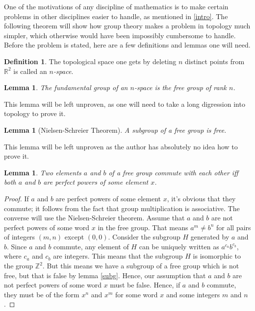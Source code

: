 \documentclass[12pt, titlepage]{article}
\newtheorem{lem}[thm]{Lemma}
\theoremstyle{definition}
\newtheorem{defn}{Definition}[section]
\begin{document}
One of the motivations of any discipline of mathematics is to make certain problems in other disciplines easier to handle, as mentioned in \autoref{intro}. The following theorem will show how group theory makes a problem in topology much simpler, which otherwise would have been impossibly cumbersome to handle. Before the problem is stated, here are a few definitions and lemmas one will need.

\begin{defn}
The topological space one gets by deleting $n$ distinct points from $\mathbb{R}^2$ is called an \emph{$n$-space}.
\end{defn}

\begin{lem}
The \emph{fundamental group} of an $n$-space is the free group of rank $n$.
\end{lem}

This lemma will be left unproven, as one will need to take a long digression into topology to prove it.

\begin{lem}[Nielsen-Schreier Theorem]\label{subg}
A subgroup of a free group is free.
\end{lem}

This lemma will be left unproven as the author has absolutely no idea how to prove it.

\begin{lem}\label{impo}
Two elements $a$ and $b$ of a free group commute with each other iff both $a$ and $b$ are perfect powers of some element $x$.
\end{lem}

\begin{proof}
If $a$ and $b$ are perfect powers of some element $x$, it's obvious that they commute; it follows from the fact that group multiplication is associative. The converse will use the Nielsen-Schreier theorem. Assume that $a$ and $b$ are not perfect powers of some word $x$ in the free group. That means $a^m \neq b^n$ for all pairs of integers $(m,n)$ except $(0,0)$. Consider the subgroup $H$ generated by $a$ and $b$. Since $a$ and $b$ commute, any element of $H$ can be uniquely written as $a^{c_a}b^{c_b}$, where $c_a$ and $c_b$ are integers. This means that the subgroup $H$ is isomorphic to the group $\mathbb{Z}^2$. But this means we have a subgroup of a free group which is not free, but that is false by lemma \autoref{subg}. Hence, our assumption that $a$ and $b$ are not perfect powers of some word $x$ must be false. Hence, if $a$ and $b$ commute, they must be of the form $x^n$ and $x^m$ for some word $x$ and some integers $m$ and $n$.
\end{proof}
\end{document}
